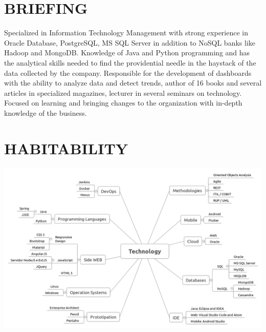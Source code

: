 \documentclass{res}
\begin{document}
	
	\thispagestyle{empty} %
	\address{{\bf Brazil - Brasília} -- Asa Norte \\
		Cel Phone. (+55061) 99874.0763 \\  Phone (+55061) 3201.5834}
	
	\begin{resume}
		
		\section{BRIEFING}
		\vspace{8pt}
		Specialized in Information Technology Management with strong experience in Oracle Database, PostgreSQL, MS SQL Server in addition to NoSQL banks like Hadoop and MongoDB. Knowledge of Java and Python programming and has the analytical skills needed to find the providential needle in the haystack of the data collected by the company. Responsible for the development of dashboards with the ability to analyze data and detect trends, author of 16 books and several articles in specialized magazines, lecturer in several seminars on technology. Focused on learning and bringing changes to the organization with in-depth knowledge of the business.
		
		\section{HABITABILITY}
		\vspace{8pt}
		\includegraphics[width=1.0\textwidth]{imagens/technology}
		

\end{resume}
\end{document}
